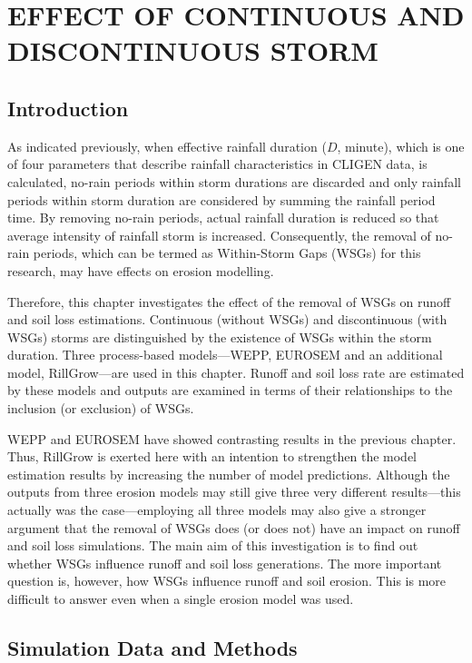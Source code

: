 \chapter{EFFECT OF CONTINUOUS AND DISCONTINUOUS STORM}
\label{sec:EFFECTSOFCONTINOUSANDDISCONTINUSSTORM}

\section{Introduction}
\label{sec:ContinousAndDiscontinousStormIntroduction}

As indicated previously, when effective rainfall duration ($D$, minute), which
is one of four parameters that describe rainfall characteristics in CLIGEN
data, is calculated, no-rain periods within storm durations are discarded and
only rainfall periods within storm duration are considered by summing the
rainfall period time. By removing no-rain periods, actual rainfall duration is
reduced so that average intensity of rainfall storm is increased. Consequently,
the removal of no-rain periods, which can be termed as Within-Storm Gaps (WSGs)
for this research, may have effects on erosion modelling.

Therefore, this chapter investigates the effect of the removal of WSGs on
runoff and soil loss estimations. Continuous (without WSGs) and discontinuous
(with WSGs) storms are distinguished by the existence of WSGs within the storm
duration. Three process-based models---WEPP, EUROSEM and an
additional model, RillGrow---are used in this chapter. Runoff and soil loss rate
are estimated by these models and outputs are examined in terms of their
relationships to the inclusion (or exclusion) of WSGs.

WEPP and EUROSEM have showed contrasting results in the previous chapter. Thus,
RillGrow is exerted here with an intention to strengthen the model estimation
results by increasing the number of model predictions. Although the outputs from
three erosion models may still give three very different results---this actually
was the case---employing all three models may also give a stronger argument that
the removal of WSGs does (or does not) have an impact on runoff and soil loss
simulations.
The main aim of this investigation is to find out whether WSGs influence runoff
and soil loss generations. The more important question is, however, how WSGs
influence runoff and soil erosion. This is more difficult to answer even when a
single erosion model was used.

\section{Simulation Data and Methods}
\label{sec:ContinousAndDiscontinousStormMethods}

